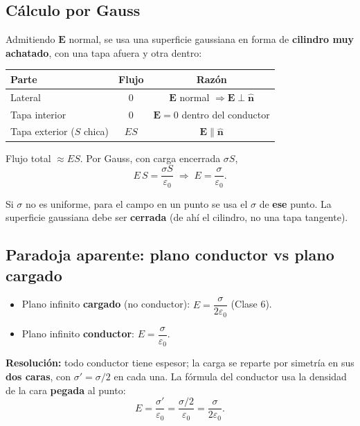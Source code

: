 \documentclass[12pt,a4paper]{article}
\begin{document}
\subsection{Cálculo por Gauss}

Admitiendo $\mathbf{E}$ normal, se usa una superficie gaussiana en forma
de \textbf{cilindro muy achatado}, con una tapa afuera y otra dentro:

\begin{center}
\begin{tabular}{lcc}
\toprule
\textbf{Parte} & \textbf{Flujo} & \textbf{Razón} \\
\midrule
Lateral            & $0$   & $\mathbf{E}$ normal $\Rightarrow \mathbf{E}\perp\hat{\mathbf{n}}$ \\
Tapa interior      & $0$   & $\mathbf{E}=0$ dentro del conductor \\
Tapa exterior ($S$ chica) & $ES$ & $\mathbf{E}\parallel\hat{\mathbf{n}}$ \\
\bottomrule
\end{tabular}
\end{center}

Flujo total $\approx ES$. Por Gauss, con carga encerrada $\sigma S$,
\[
E\,S = \frac{\sigma S}{\varepsilon_0}
\;\Longrightarrow\;
\boxed{E = \frac{\sigma}{\varepsilon_0}} .
\]



\begin{notebox}
  Si $\sigma$ no es uniforme, para el campo en un punto se usa el
  $\sigma$ de \textbf{ese} punto. La superficie gaussiana debe ser
  \textbf{cerrada} (de ahí el cilindro, no una tapa tangente).
\end{notebox}

\subsection{Paradoja aparente: plano conductor vs plano cargado}

\begin{itemize}[nosep]
  \item Plano infinito \textbf{cargado} (no conductor):
        $E = \dfrac{\sigma}{2\varepsilon_0}$ (Clase 6).
  \item Plano infinito \textbf{conductor}:
        $E = \dfrac{\sigma}{\varepsilon_0}$.
\end{itemize}

\textbf{Resolución:} todo conductor tiene espesor; la carga se reparte
por simetría en sus \textbf{dos caras}, con $\sigma' = \sigma/2$ en cada
una. La fórmula del conductor usa la densidad de la cara \textbf{pegada}
al punto:
\[
E = \frac{\sigma'}{\varepsilon_0} = \frac{\sigma/2}{\varepsilon_0}
  = \frac{\sigma}{2\varepsilon_0} .
\]
\end{document}
